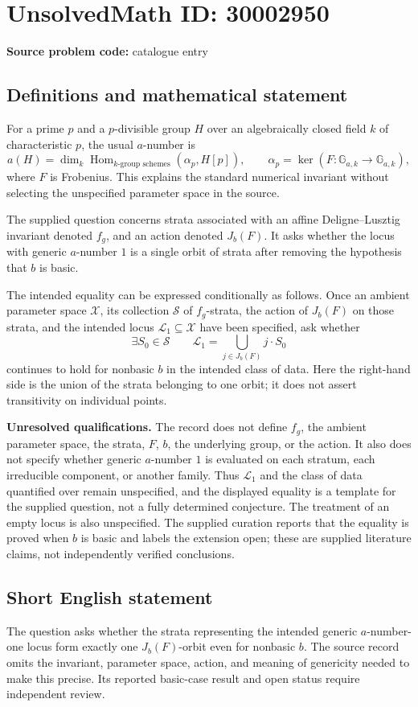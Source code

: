\documentclass[11pt]{article}
\begin{document}
\section*{UnsolvedMath ID: 30002950}
\textbf{Source problem code:} catalogue entry
\subsection{Definitions and mathematical statement}
For a prime \(p\) and a \(p\)-divisible group \(H\) over an algebraically closed field \(k\) of characteristic \(p\), the usual \(a\)-number is
\[
a(H)=\dim_k\operatorname{Hom}_{k\text{-group schemes}}(\alpha_p,H[p]),
\qquad
\alpha_p=\ker(F:\mathbb G_{a,k}\longrightarrow\mathbb G_{a,k}),
\]
where \(F\) is Frobenius. This explains the standard numerical invariant without selecting the unspecified parameter space in the source.

The supplied question concerns strata associated with an affine Deligne--Lusztig invariant denoted \(f_g\), and an action denoted \(J_b(F)\). It asks whether the locus with generic \(a\)-number \(1\) is a single orbit of strata after removing the hypothesis that \(b\) is basic.

The intended equality can be expressed conditionally as follows. Once an ambient parameter space \(\mathscr X\), its collection \(\mathscr S\) of \(f_g\)-strata, the action of \(J_b(F)\) on those strata, and the intended locus \(\mathscr L_1\subseteq\mathscr X\) have been specified, ask whether
\[
\exists S_0\in\mathscr S\qquad
\mathscr L_1=\bigcup_{j\in J_b(F)}j\cdot S_0
\]
continues to hold for nonbasic \(b\) in the intended class of data. Here the right-hand side is the union of the strata belonging to one orbit; it does not assert transitivity on individual points.

\textbf{Unresolved qualifications.} The record does not define \(f_g\), the ambient parameter space, the strata, \(F\), \(b\), the underlying group, or the action. It also does not specify whether generic \(a\)-number \(1\) is evaluated on each stratum, each irreducible component, or another family. Thus \(\mathscr L_1\) and the class of data quantified over remain unspecified, and the displayed equality is a template for the supplied question, not a fully determined conjecture. The treatment of an empty locus is also unspecified. The supplied curation reports that the equality is proved when \(b\) is basic and labels the extension open; these are supplied literature claims, not independently verified conclusions.
\subsection{Short English statement}
The question asks whether the strata representing the intended generic \(a\)-number-one locus form exactly one \(J_b(F)\)-orbit even for nonbasic \(b\). The source record omits the invariant, parameter space, action, and meaning of genericity needed to make this precise. Its reported basic-case result and open status require independent review.
\end{document}
